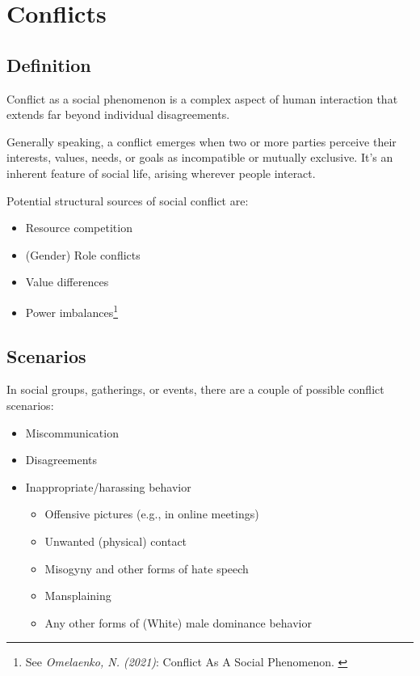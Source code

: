 %
%

\pagebreak
\section{Conflicts}

\onehalfspacing

\subsection{Definition}

Conflict as a social phenomenon is a complex aspect of human interaction that extends far beyond individual disagreements.

Generally speaking, a conflict emerges when two or more parties perceive their interests, values, needs, or goals as incompatible or mutually exclusive. It's an inherent feature of social life, arising wherever people interact.

Potential structural sources of social conflict are:

\begin{itemize}
    \item Resource competition
    \item (Gender) Role conflicts
    \item Value differences
    \item Power imbalances\footnote{See \textit{Omelaenko, N. (2021)}: Conflict As A Social Phenomenon. \cite{conflict}}
\end{itemize}

\subsection{Scenarios}

In social groups, gatherings, or events, there are a couple of possible conflict scenarios:

\begin{itemize}
    \item Miscommunication
    \item Disagreements
    \item Inappropriate/harassing behavior
    \begin{itemize}
        \item Offensive pictures (e.g., in online meetings)
        \item Unwanted (physical) contact
        \item Misogyny and other forms of hate speech
        \item Mansplaining
        \item Any other forms of (White) male dominance behavior
    \end{itemize}    
\end{itemize}

